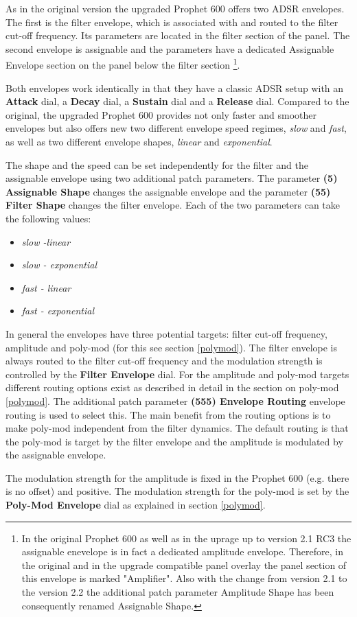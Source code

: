 As in the original version the upgraded Prophet 600 offers two ADSR envelopes. The first is the filter envelope, which is associated with and routed to the filter cut-off frequency. Its parameters are located in the filter section of the panel. The second envelope is assignable and the parameters have a dedicated Assignable Envelope section on the panel below the filter section \footnote{In the original Prophet 600 as well as in the uprage up to version 2.1 RC3 the assignable enevelope is in fact a dedicated amplitude envelope. Therefore, in the original and in the upgrade compatible panel overlay the panel section of this envelope is marked "Amplifier". Also with the change from version 2.1 to the version 2.2 the additional patch parameter Amplitude Shape has been consequently renamed Assignable Shape.}.

Both envelopes work identically in that they have a classic ADSR setup with an \textbf{Attack} dial, a \textbf{Decay} dial, a \textbf{Sustain} dial and a \textbf{Release} dial. Compared to the original, the upgraded Prophet 600 provides not only faster and smoother envelopes but also offers new two different envelope speed regimes, \textit{slow} and \textit{fast}, as well as two different envelope shapes, \textit{linear} and \textit{exponential}.

The shape and the speed can be set independently for the filter and the assignable envelope using two additional patch parameters. The parameter \textbf{(5) Assignable Shape} changes the assignable envelope and the parameter \textbf{(55) Filter Shape} changes the filter envelope. Each of the two parameters can take the following values:

\begin{itemize}
  \setlength\itemsep{0cm}
  \item \textit{slow -linear}
  \item \textit{slow - exponential}
  \item \textit{fast - linear}
  \item \textit{fast - exponential}
\end{itemize}
 
In general the envelopes have three potential targets: filter cut-off frequency, amplitude and poly-mod (for this see section \ref{polymod}). The filter envelope is always routed to the filter cut-off frequency and the modulation strength is controlled by the \textbf{Filter Envelope} dial. For the  amplitude and poly-mod targets different routing options exist as described in detail in the section on poly-mod \ref{polymod}. The additional patch parameter \textbf{(555) Envelope Routing} envelope routing is used to select this. The main benefit from the routing options is to make poly-mod independent from the filter dynamics. The default routing is that the poly-mod is target by the filter envelope and the amplitude is modulated by the assignable envelope.

The modulation strength for the amplitude is fixed in the Prophet 600 (e.g. there is no offset) and positive. The modulation strength for the poly-mod is set by the \textbf{Poly-Mod Envelope} dial as explained in section \ref{polymod}. 
